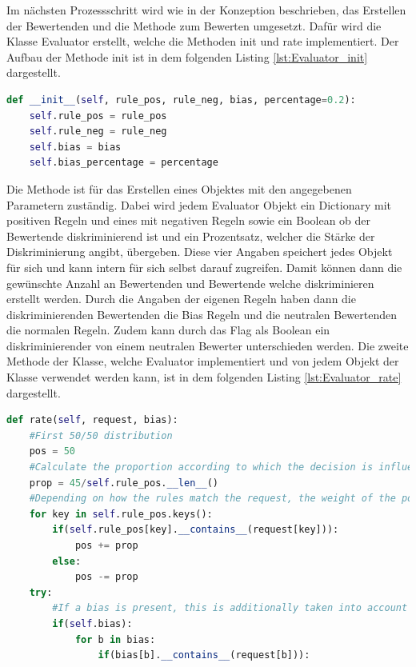 \begin{onehalfspace}
Im nächsten Prozessschritt wird wie in der Konzeption beschrieben, das Erstellen der Bewertenden und die Methode zum Bewerten umgesetzt. Dafür wird die Klasse \glqq{}Evaluator\grqq{} erstellt, welche die Methoden \glqq{}init\grqq{} und \glqq{}rate\grqq{} implementiert. Der Aufbau der Methode \glqq{}init\grqq{} ist in dem folgenden Listing \ref{lst:Evaluator_init} dargestellt.
\begin{lstlisting}[language=Python,label={lst:Evaluator_init},caption=Methode zur Initialisierung eines Bewertenden]
def __init__(self, rule_pos, rule_neg, bias, percentage=0.2):
    self.rule_pos = rule_pos
    self.rule_neg = rule_neg
    self.bias = bias
    self.bias_percentage = percentage
\end{lstlisting}
Die Methode ist für das Erstellen eines Objektes mit den angegebenen Parametern zuständig. Dabei wird jedem \glqq{}Evaluator\grqq{} Objekt ein Dictionary mit positiven Regeln und eines mit negativen Regeln sowie ein Boolean ob der Bewertende diskriminierend ist und ein Prozentsatz, welcher die Stärke der Diskriminierung angibt, übergeben. Diese vier Angaben speichert jedes Objekt für sich und kann intern für sich selbst darauf zugreifen. Damit können dann die gewünschte Anzahl an Bewertenden und Bewertende welche diskriminieren erstellt werden. Durch die Angaben der eigenen Regeln haben dann die diskriminierenden Bewertenden die Bias Regeln und die neutralen Bewertenden die normalen Regeln. Zudem kann durch das Flag als Boolean ein diskriminierender von einem neutralen Bewerter unterschieden werden.
Die zweite Methode der Klasse, welche \glqq{}Evaluator\grqq{} implementiert und von jedem Objekt der Klasse verwendet werden kann, ist in dem folgenden Listing \ref{lst:Evaluator_rate} dargestellt.
\begin{lstlisting}[language=Python,label={lst:Evaluator_rate},caption=Methode eines Bewertenden zum Bewerten von Anträgen]
def rate(self, request, bias):
    #First 50/50 distribution
    pos = 50
    #Calculate the proportion according to which the decision is influenced positively or negatively.
    prop = 45/self.rule_pos.__len__()
    #Depending on how the rules match the request, the weight of the positive evaluation is shifted.
    for key in self.rule_pos.keys():
        if(self.rule_pos[key].__contains__(request[key])):
            pos += prop
        else:
            pos -= prop
    try:
        #If a bias is present, this is additionally taken into account with the Parameter in %
        if(self.bias):
            for b in bias:
                if(bias[b].__contains__(request[b])):

\end{lstlisting}
\end{onehalfspace}

